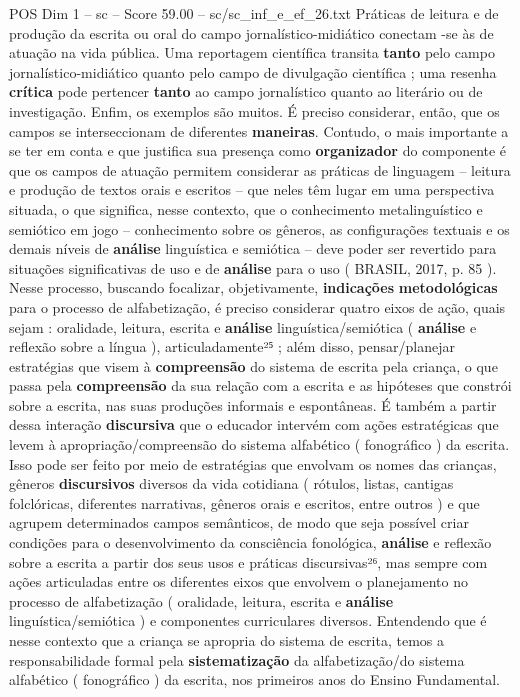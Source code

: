 \begin{textsample}{POS Dim 1 – sc – Score 59.00 – sc/sc\_inf\_e\_ef\_26.txt}
Práticas de leitura e de produção da escrita ou oral do campo jornalístico-midiático conectam -se às de atuação na vida pública.
Uma reportagem científica transita \textbf{tanto} pelo campo jornalístico-midiático quanto pelo campo de divulgação científica ; uma resenha \textbf{crítica} pode pertencer \textbf{tanto} ao campo jornalístico quanto ao literário ou de investigação.
Enfim, os exemplos são muitos.
É preciso considerar, então, que os campos se interseccionam de diferentes \textbf{maneiras}.
Contudo, o mais importante a se ter em conta e que justifica sua presença como \textbf{organizador} do componente é que os campos de atuação permitem considerar as práticas de linguagem – leitura e produção de textos orais e escritos – que neles têm lugar em uma perspectiva situada, o que significa, nesse contexto, que o conhecimento metalinguístico e semiótico em jogo – conhecimento sobre os gêneros, as configurações textuais e os demais níveis de \textbf{análise} linguística e semiótica – deve poder ser revertido para situações significativas de uso e de \textbf{análise} para o uso ( BRASIL, 2017, p. 85 ).
Nesse processo, buscando focalizar, objetivamente, \textbf{indicações} \textbf{metodológicas} para o processo de alfabetização, é preciso considerar quatro eixos de ação, quais sejam : oralidade, leitura, escrita e \textbf{análise} linguística/semiótica ( \textbf{análise} e reflexão sobre a língua ), articuladamente²⁵ ; além disso, pensar/planejar estratégias que visem à \textbf{compreensão} do sistema de escrita pela criança, o que passa pela \textbf{compreensão} da sua relação com a escrita e as hipóteses que constrói sobre a escrita, nas suas produções informais e espontâneas.
É também a partir dessa interação \textbf{discursiva} que o educador intervém com ações estratégicas que levem à apropriação/compreensão do sistema alfabético ( fonográfico ) da escrita.
Isso pode ser feito por meio de estratégias que envolvam os nomes das crianças, gêneros \textbf{discursivos} diversos da vida cotidiana ( rótulos, listas, cantigas folclóricas, diferentes narrativas, gêneros orais e escritos, entre outros ) e que agrupem determinados campos semânticos, de modo que seja possível criar condições para o desenvolvimento da consciência fonológica, \textbf{análise} e reflexão sobre a escrita a partir dos seus usos e práticas discursivas²⁶, mas sempre com ações articuladas entre os diferentes eixos que envolvem o planejamento no processo de alfabetização ( oralidade, leitura, escrita e \textbf{análise} linguística/semiótica ) e componentes curriculares diversos.
Entendendo que é nesse contexto que a criança se apropria do sistema de escrita, temos a responsabilidade formal pela \textbf{sistematização} da alfabetização/do sistema alfabético ( fonográfico ) da escrita, nos primeiros anos do Ensino Fundamental.

\end{textsample}

